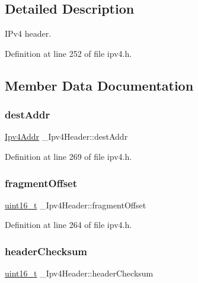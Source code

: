 \subsection{Detailed Description}
I\+Pv4 header. 

Definition at line 252 of file ipv4.\+h.



\subsection{Member Data Documentation}
\mbox{\label{struct__Ipv4Header_ab91a908398b8cbcfb79ac5326047a2c5}} 
\subsubsection{\texorpdfstring{dest\+Addr}{destAddr}}
{\footnotesize\ttfamily \hyperlink{ipv4_8h_a411debb3d770caa0c06d3f73367da37f}{Ipv4\+Addr} \+\_\+\+Ipv4\+Header\+::dest\+Addr}



Definition at line 269 of file ipv4.\+h.

\mbox{\label{struct__Ipv4Header_ac6b4c00b707af577d45e6dd5afccd54a}} 
\subsubsection{\texorpdfstring{fragment\+Offset}{fragmentOffset}}
{\footnotesize\ttfamily \hyperlink{stdint_8h_a273cf69d639a59973b6019625df33e30}{uint16\+\_\+t} \+\_\+\+Ipv4\+Header\+::fragment\+Offset}



Definition at line 264 of file ipv4.\+h.

\mbox{\label{struct__Ipv4Header_a82cbdc6a7da141c30e4a03492470ab0b}} 
\subsubsection{\texorpdfstring{header\+Checksum}{headerChecksum}}
{\footnotesize\ttfamily \hyperlink{stdint_8h_a273cf69d639a59973b6019625df33e30}{uint16\+\_\+t} \+\_\+\+Ipv4\+Header\+::header\+Checksum}



